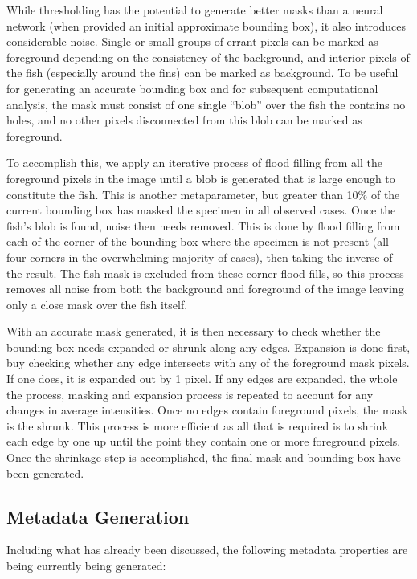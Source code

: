 \documentclass[screen,review]{acmart}
\begin{document}
While thresholding has the potential to generate better masks than a neural network (when provided an initial approximate bounding box), it also introduces considerable noise. Single or small groups of errant pixels can be marked as foreground depending on the consistency of the background, and interior pixels of the fish (especially around the fins) can be marked as background. To be useful for generating an accurate bounding box and for subsequent computational analysis, the mask must consist of one single ``blob'' over the fish the contains no holes, and no other pixels disconnected from this blob can be marked as foreground.

To accomplish this, we apply an iterative process of flood filling from all the foreground pixels in the image until a blob is generated that is large enough to constitute the fish. This is another metaparameter, but greater than 10\% of the current bounding box has masked the specimen in all observed cases. Once the fish's blob is found, noise then needs removed. This is done by flood filling from each of the corner of the bounding box where the specimen is not present (all four corners in the overwhelming majority of cases), then taking the inverse of the result. The fish mask is excluded from these corner flood fills, so this process removes all noise from both the background and foreground of the image leaving only a close mask over the fish itself.

With an accurate mask generated, it is then necessary to check whether the bounding box needs expanded or shrunk along any edges. Expansion is done first, buy checking whether any edge intersects with any of the foreground mask pixels. If one does, it is expanded out by 1 pixel. If any edges are expanded, the whole the process, masking and expansion process is repeated to account for any changes in average intensities. Once no edges contain foreground pixels, the mask is the shrunk. This process is more efficient as all that is required is to shrink each edge by one up until the point they contain one or more foreground pixels. Once the shrinkage step is accomplished, the final mask and bounding box have been generated.
\subsection{Metadata Generation}
Including what has already been discussed, the following metadata properties are being currently being generated:
\end{document}
